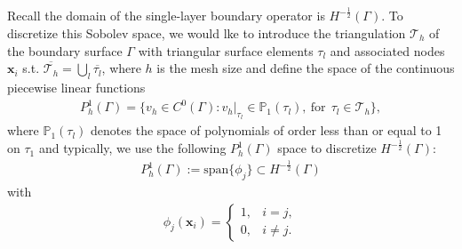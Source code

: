 Recall the domain of the single-layer boundary operator is $H^{-\frac{1}{2}}(\Gamma)$. To discretize this Sobolev space, we would lke to introduce the 
triangulation $\mathcal{T}_{h}$ of the boundary surface $\Gamma$ with triangular surface elements $\tau_{l}$ and associated nodes $\boldsymbol{x}_{i}$ 
s.t. $\overline{\mathcal{T}_{h}} = \bigcup_{l}\overline{\tau_{l}}$, where $h$ is the mesh size and define the space of the continuous piecewise linear functions
\begin{align*}
    P_{h}^{1}(\Gamma) = \{v_{h}\in C^{0}(\Gamma): v_{h}|_{\tau_{l}}\in\mathbb{P}_{1}(\tau_{l}), \ \text{for} \ \ \tau_{l}\in\mathcal{T}_{h}\},
\end{align*}
where $\mathbb{P}_{1}(\tau_{l})$ denotes the space of polynomials of order less than or equal to 1 on $\tau_{1}$
and typically, we use the following $P_{h}^{1}(\Gamma)$ space to discretize $H^{-\frac{1}{2}}(\Gamma)$:
\begin{align*}
    P_{h}^{1}(\Gamma) := \text{span}\{\phi_{j}\} \subset H^{-\frac{1}{2}}(\Gamma)
\end{align*}
with 
\begin{align*}
    \phi_{j}(\boldsymbol{x}_{i}) = \begin{cases}
        1, & i = j,\\
        0, & i\neq j.
    \end{cases}
\end{align*}

